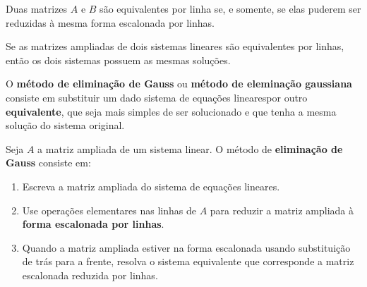 \documentclass{beamer}
\begin{document}
    \begin{frame}
        \begin{teorema}
            Duas matrizes $A$ e $B$ são equivalentes por linha se, e somente, se elas puderem ser reduzidas à mesma forma escalonada por linhas.
        \end{teorema}
    \end{frame}

    \begin{frame}
        \begin{teorema}
            Se as matrizes ampliadas \pause de dois sistemas lineares são equivalentes por linhas, \pause então os dois sistemas possuem as mesmas soluções.
        \end{teorema}
    \end{frame}

    \begin{frame}
        O \textbf{método de eliminação de Gauss} \pause ou \textbf{método de eleminação gaussiana} \pause consiste em substituir um dado sistema de equações lineares\pause  por outro \textbf{equivalente}, que seja mais simples de ser solucionado \pause e que tenha a mesma solução do sistema original.\pause

        \begin{definicao}
            Seja $A$ a matriz ampliada de um sistema linear. \pause O método de \textbf{eliminação de Gauss} consiste em:\pause
            \begin{enumerate}[label={\roman*})]
                \item Escreva a matriz ampliada do sistema de equações lineares.\pause

                \item Use operações elementares nas linhas de $A$ para reduzir a matriz ampliada à \textbf{forma escalonada por linhas}.\pause
                
                \item Quando a matriz ampliada estiver na forma escalonada usando substituição de trás para a frente, \pause resolva o sistema equivalente que corresponde a matriz escalonada reduzida por linhas.
            \end{enumerate}
        \end{definicao}
    \end{frame}
    
\end{document}
